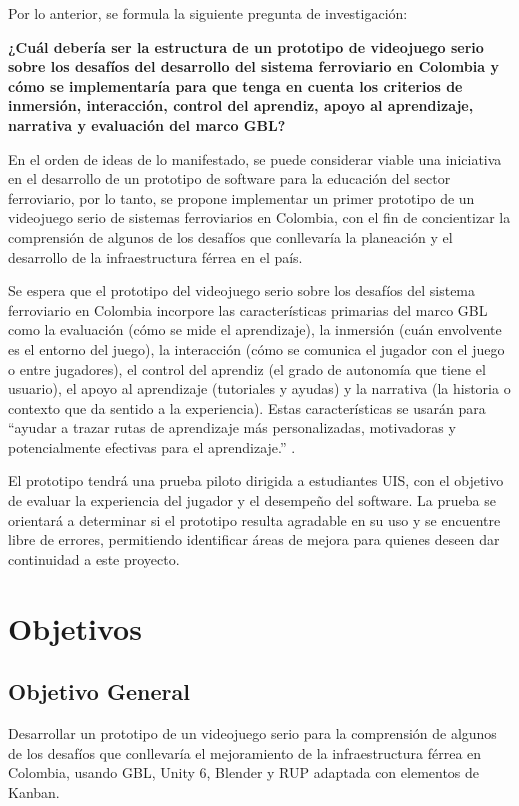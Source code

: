 Por lo anterior, se formula la siguiente pregunta de investigación:

\textbf{¿Cuál debería ser la estructura de un prototipo de videojuego serio sobre los desafíos del desarrollo del sistema ferroviario en Colombia y cómo se implementaría para que tenga en cuenta los criterios de inmersión, interacción, control del aprendiz, apoyo al aprendizaje, narrativa y evaluación del marco GBL?}

En el orden de ideas de lo manifestado, se puede considerar viable una iniciativa en el desarrollo de un prototipo de software para la educación del sector ferroviario, por lo tanto, se propone implementar un primer prototipo de un videojuego serio de sistemas ferroviarios en Colombia, con el fin de concientizar la comprensión de algunos de los desafíos que conllevaría la planeación y el desarrollo de la infraestructura férrea en el país.

Se espera que el prototipo del videojuego serio sobre los desafíos del sistema ferroviario en Colombia incorpore las características primarias del marco GBL como la evaluación (cómo se mide el aprendizaje), la inmersión (cuán envolvente es el entorno del juego), la interacción (cómo se comunica el jugador con el juego o entre jugadores), el control del aprendiz (el grado de autonomía que tiene el usuario), el apoyo al aprendizaje (tutoriales y ayudas) y la narrativa (la historia o contexto que da sentido a la experiencia). Estas características se usarán para “ayudar a trazar rutas de aprendizaje más personalizadas, motivadoras y potencialmente efectivas para el aprendizaje.” \autocite[p.~10]{gblHandbook2019}.

El prototipo tendrá una prueba piloto dirigida a estudiantes UIS, con el objetivo de evaluar la experiencia del jugador y el desempeño del software. La prueba se orientará a determinar si el prototipo resulta agradable en su uso y se encuentre libre de errores, permitiendo identificar áreas de mejora para quienes deseen dar continuidad a este proyecto.

\section{Objetivos}

\subsection{Objetivo General}
Desarrollar un prototipo de un videojuego serio para la comprensión de algunos de los desafíos que conllevaría el mejoramiento de la infraestructura férrea en Colombia, usando GBL, Unity 6, Blender y RUP adaptada con elementos de Kanban.

